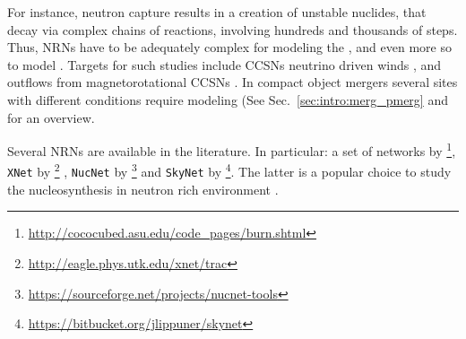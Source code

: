 %
%
%
For instance, neutron capture results in a creation of unstable nuclides, 
that decay via complex chains of reactions, involving hundreds and thousands of steps. 
Thus, \acp{NRN} have to be adequately complex for modeling 
the \sproc{}, \citep[\eg][]{Prantzos:1990,Kaeppeler:2011,Nishimura:2017zdi} 
and even more so to model \rproc{}. 
%
Targets for such studies include 
\acp{CCSN} neutrino driven winds \citep[\eg][]{Woosley:1992,Arcones:2010,Wanajo:2013},
and outflows from magnetorotational \acp{CCSN} \citep[\eg][]{Winteler:2012,Nishimura:2015nca}.
In compact object mergers several sites with different conditions 
require modeling (See Sec.~\ref{sec:intro:merg_pmerg} and %
%
\citet[\eg][]{Blinnikov:1996,Panov:1995,Panov:2001,Mumpower:2011ar,Lippuner:2018phd} for an overview.

Several \acp{NRN} are available in the literature. 
In particular: a set of networks by 
\citet{Timmes:1999}\footnote{\url{http://cococubed.asu.edu/code_pages/burn.shtml}}, 
\texttt{XNet} by \citet{Hix:1999}\footnote{\url{http://eagle.phys.utk.edu/xnet/trac}} , 
\texttt{NucNet} by \citet{Meyer:2007}\footnote{\url{https://sourceforge.net/projects/nucnet-tools}}
and \texttt{SkyNet} by \citet{Lippuner:2015gwa}\footnote{\url{https://bitbucket.org/jlippuner/skynet}}.
%
The latter is a popular choice to study the nucleosynthesis 
in neutron rich environment \citep[\eg]{Lippuner:2015gwa,Radice:2016dwd}. 


